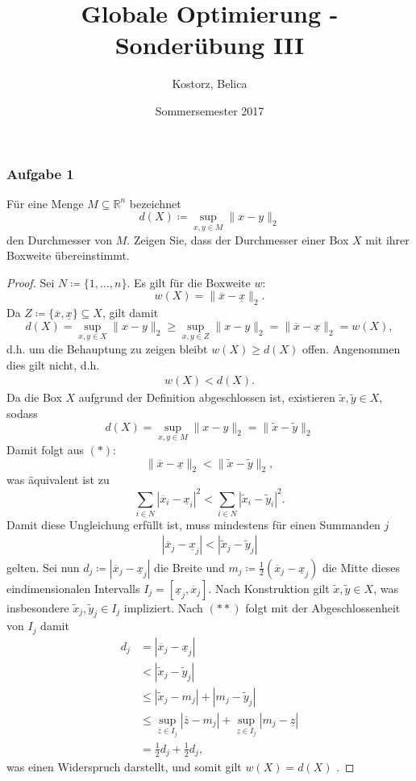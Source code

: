 \documentclass[12pt]{extreport} %
\title{Globale Optimierung - Sonderübung III}
\author{Kostorz, Belica}
\date{Sommersemester 2017}
\newcommand{\R}{\mathbb{R}}
\begin{document}
\thispagestyle{empty}
\thispagestyle{firststyle}

\subsubsection*{Aufgabe 1}

Für eine Menge $M \subseteq \R^n$ bezeichnet 
	$$ d(X) \coloneqq \sup_{x,y \in M} \| x - y \|_2 $$
den Durchmesser von $M$. Zeigen Sie, dass der Durchmesser einer Box $X$ mit ihrer Boxweite übereinstimmt.

\begin{proof}
	Sei $N \coloneqq \{1, \dotsc, n\}$. Es gilt für die Boxweite $w$:
	$$ w(X) = \| \overline{x} - \underline{x} \|_2. $$ 
	Da $Z \coloneqq \{ \overline{x}, \underline{x} \} \subseteq X$, gilt damit
	$$ d(X) = \sup_{x,y \in X} \| x - y \|_2 \geq \sup_{x,y \in Z } \| x - y \|_2 =  \| \overline{x} - \underline{x} \|_2 = w(X), $$
	d.h. um die Behauptung zu zeigen bleibt $w(X) \geq d(X)$ offen. Angenommen dies gilt nicht, d.h.
	\begin{align*}
		 w(X) < d(X). \tag*{$(*)$}
	\end{align*}
	Da die Box $X$ aufgrund der Definition abgeschlossen ist, existieren $\tilde{x}, \tilde{y} \in X$, sodass
	$$ d(X) = \sup_{x,y \in M} \| x - y \|_2 = \| \tilde{x} - \tilde{y} \|_2 $$
	Damit folgt aus $(*)$:
	 $$ \| \overline{x} - \underline{x} \|_2 < \| \tilde{x} - \tilde{y} \|_2, $$
	 was äquivalent ist zu
	 $$ \sum_{i \in N} | \overline{x}_i - \underline{x}_i |^2 < \sum_{ i \in N} | \tilde{x}_i - \tilde{y}_i |^2. $$
	Damit diese Ungleichung erfüllt ist, muss mindestens für einen Summanden $j$ 
	\begin{align*}
		| \overline{x}_j - \underline{x}_j | <  | \tilde{x}_j - \tilde{y}_j | \tag*{$(**)$}
	\end{align*} 
	gelten. Sei nun $d_j \coloneqq | \overline{x}_j - \underline{x}_j |$ die Breite und $m_j \coloneqq \frac{1}{2} \left( \overline{x}_j - \underline{x}_j \right)$ die Mitte dieses eindimensionalen Intervalls $I_j = \left[ \underline{x}_j, \overline{x}_j \right]$. Nach Konstruktion gilt $\tilde{x}, \tilde{y} \in X$, was insbesondere $\tilde{x}_j, \tilde{y}_j \in I_j$ impliziert. Nach $(**)$ folgt mit der Abgeschlossenheit von $I_j$ damit
	\begin{align*}
		d_j & = \left| \overline{x}_j - \underline{x}_j \right| \\
			& <  \left| \tilde{x}_j - \tilde{y}_j \right| \\
			& \leq \left| \tilde{x}_j - m_j \right| + \left| m_j - \tilde{y}_j \right| \\
			& \leq \sup_{\overline{z} \in I_j} \left| \overline{z} - m_j \right| + \sup_{\underline{z} \in I_j} \left| m_j - \underline{z} \right|  \\ 
			& =  \frac{1}{2} d_j + \frac{1}{2} d_j,
	\end{align*}
	was einen Widerspruch darstellt, und somit gilt $w(X) = d(X)$ .
\end{proof}
\end{document}
